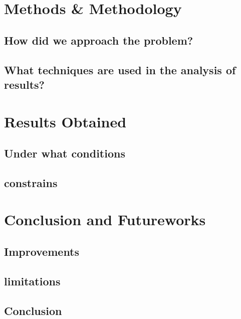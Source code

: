\documentclass{article}
\begin{document}
\newpage
\section{Methods \& Methodology}
\subsection{How did we approach the problem?}
\subsection{What techniques are used in the analysis of results?}

\newpage
\section{Results Obtained}
\subsection{Under what conditions}
\subsection{constrains}

\newpage
\section{Conclusion and Futureworks}
\subsection{Improvements}
\subsection{limitations}
\subsection{Conclusion}



\newpage
\end{document}
